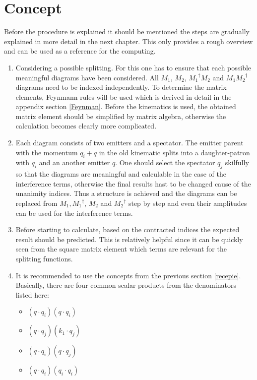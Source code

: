 \section*{Concept}
\label{Concept}

Before the procedure is explained it should be mentioned the steps are gradually explained in more detail in the next chapter. This only provides a rough overview and can be used as a reference for the computing.
\\
\renewcommand{\labelenumi}{\roman{enumi})}
\begin{enumerate}
\item Considering a possible splitting. For this one has to ensure that each possible meaningful diagrams have been considered.
All $ M_1 $, $ M_2 $, $ {M_1}^{\dagger} M_2 $ and $ M_1{M_2}^{\dagger}$ diagrams need to be indexed independently.  To determine the matrix elements, Feynmann rules will be used which is derived in detail in the appendix section \ref{Feynman}. Before the kinematics is used, the obtained matrix element should be simplified by matrix algebra, otherwise the calculation becomes clearly more complicated.
\\
\item Each diagram consists of two emitters and a spectator.
The emitter parent with the momentum $ q_i+q $ in the old kinematic splits into a daughter-patron with $ q_i $ and an another emitter $ q $. One should select the spectator $ q_j $ skilfully so that the diagrams are meaningful and calculable in the case of the interference terms, otherwise the final results hast to be changed cause of the unanimity  indices. Thus a structure is achieved and the diagrams can be replaced from $ M_1, {M_1}^{\dagger}$,  $ M_2 $ and ${M_2}^{\dagger}$ step by step and even their amplitudes can be used for the interference terms. 
\\
\item Before starting to calculate, based on the contracted indices the expected result should be predicted. This is relatively helpful since it can be quickly seen from the square matrix element which terms are relevant for the splitting functions.
\\
\item It is recommended to use the concepts from the previous section \ref{recepie}. Basically, there are four common scalar products from the denominators listed here:

\begin{itemize}
\item $ (q \cdot q_i)(q \cdot q_i) $
\item $ (q \cdot q_j)(k_1 \cdot q_j) $
\item $ (q \cdot q_i)(q \cdot q_j) $
\item $ (q \cdot q_i)(q_i \cdot q_i) $
\end{itemize}


\end{enumerate}

